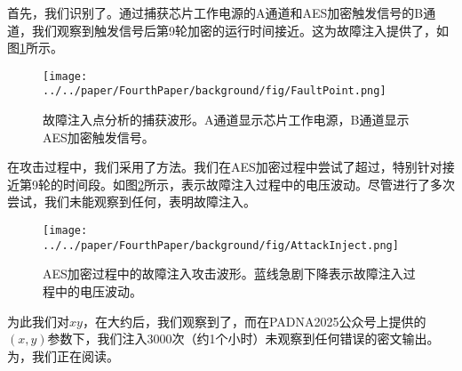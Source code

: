 \documentclass{article}
\begin{document}
首先，我们识别了。通过捕获芯片工作电源的A通道和AES加密触发信号的B通道，我们观察到触发信号后第9轮加密的运行时间接近。这为故障注入提供了，如图\ref{fig:fault_point}所示。

\begin{figure}[htbp]
    \centering
    \texttt{[image: ../../paper/FourthPaper/background/fig/FaultPoint.png]}
    \caption{故障注入点分析的捕获波形。A通道显示芯片工作电源，B通道显示AES加密触发信号。}
    \label{fig:fault_point}
\end{figure}

在攻击过程中，我们采用了方法。我们在AES加密过程中尝试了超过，特别针对接近第9轮的时间段。如图\ref{fig:attack_inject}所示，表示故障注入过程中的电压波动。尽管进行了多次尝试，我们未能观察到任何，表明故障注入。

\begin{figure}[htbp]
    \centering
    \texttt{[image: ../../paper/FourthPaper/background/fig/AttackInject.png]}
    \caption{AES加密过程中的故障注入攻击波形。蓝线急剧下降表示故障注入过程中的电压波动。}
    \label{fig:attack_inject}
\end{figure}

为此我们对$x$$y$，在大约后，我们观察到了，而在PADNA2025公众号上提供的$(x,y)$参数下，我们注入3000次（约1个小时）未观察到任何错误的密文输出。为，我们正在阅读\cite{TCHES:BozFocPal19}。



\end{document}
